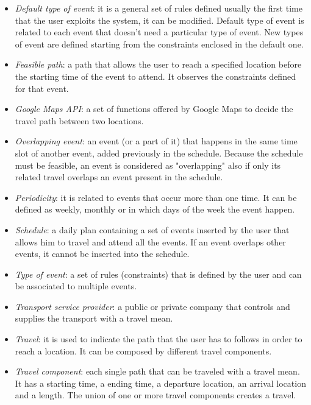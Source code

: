 \begin{itemize}
	\item \textit{Default type of event}: it is a general set of rules defined usually the first time that the user exploits the system, it can be modified. Default type of event is related to each event that doesn't need a particular type of event. New types of event are defined starting from the constraints enclosed in the default one.	
	\item \textit{Feasible path}: a path that allows the user to reach a specified location before the starting time of the event to attend. It observes the constraints defined for that event.
	\item \textit{Google Maps API}: a set of functions offered by Google Maps to decide the travel path between two locations.
	\item \textit{Overlapping event}: an event (or a part of it) that happens in the same time slot of another event, added previously in the schedule. Because the schedule must be feasible, an event is considered as "overlapping" also if only its related travel overlaps an event present in the schedule.
	\item \textit{Periodicity}: it is related to events that occur more than one time. It can be defined as weekly, monthly or in which days of the week the event happen.
	\item \textit{Schedule}: a daily plan containing a set of events inserted by the user that allows him to travel and attend all the events. If an event overlaps other events, it cannot be inserted into the schedule. 
	\item \textit{Type of event}: a set of rules (constraints) that is defined by the user and can be associated to multiple events.
	\item \textit{Transport service provider}: a public or private company that controls and supplies the transport with a travel mean. 
	\item \textit{Travel}: it is used to indicate the path that the user has to follows in order to reach a location. It can be composed by different travel components.
	\item \textit{Travel component}: each single path that can be traveled with a travel mean. It has a starting time, a ending time, a departure location, an arrival location and a length. The union of one or more travel components creates a travel.
	\end{itemize}